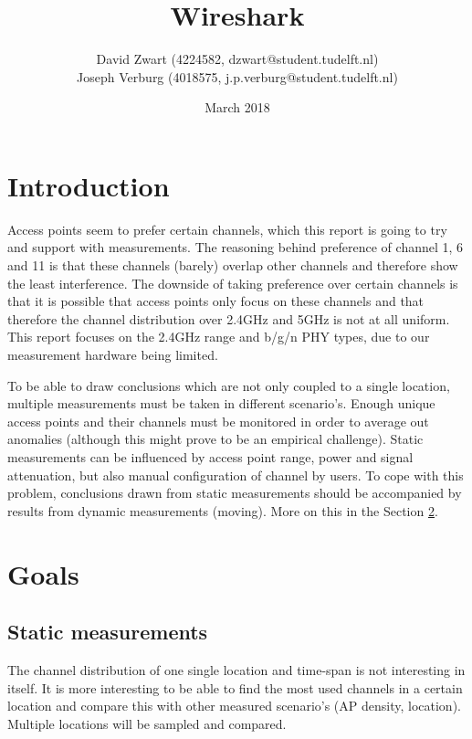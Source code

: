 \documentclass[11pt,a4paper]{article}
\title{Wireshark}
\author{
David Zwart (4224582, dzwart@student.tudelft.nl) \\
Joseph Verburg (4018575, j.p.verburg@student.tudelft.nl)
}
\date{March 2018}
\begin{document}
\maketitle

\section{Introduction}
Access points seem to prefer certain channels, which this report is going to try and support with measurements. The reasoning behind preference of channel 1, 6 and 11 is that these channels (barely) overlap other channels and therefore show the least interference. The downside of taking preference over certain channels is that it is possible that access points only focus on these channels and that therefore the channel distribution over 2.4GHz and 5GHz is not at all uniform. This report focuses on the 2.4GHz range and b/g/n PHY types, due to our measurement hardware being limited. 

To be able to draw conclusions which are not only coupled to a single location, multiple measurements must be taken in different scenario's. Enough unique access points and their channels must be monitored in order to average out anomalies (although this might prove to be an empirical challenge). Static measurements can be influenced by access point range, power and signal attenuation, but also manual configuration of channel by users. To cope with this problem, conclusions drawn from static measurements should be accompanied by results from dynamic measurements (moving). More on this in the Section \ref{sec:goals}. \\

\section{Goals}
\label{sec:goals}
\subsection{Static measurements}
The channel distribution of one single location and time-span is not interesting in itself. It is more interesting to be able to find the most used channels in a certain location and compare this with other measured scenario's (AP density, location). Multiple locations will be sampled and compared. \\
\end{document}
